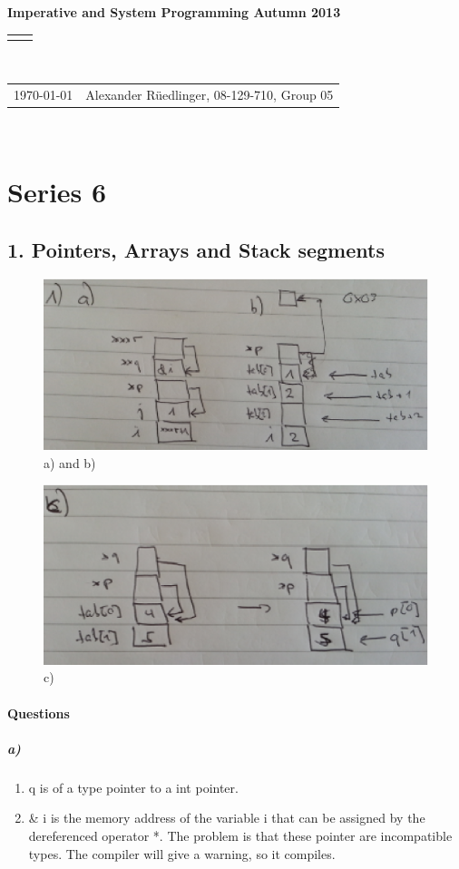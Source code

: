 \documentclass[12pt]{article}
\renewcommand{\title}[1]{\textbf{#1}\\}
\renewcommand{\line}{\begin{tabularx}{\textwidth}{X>{\raggedleft}X}\hline\\\end{tabularx}\\[-0.5cm]}
\newcommand{\leftright}[2]{\begin{tabularx}{\textwidth}{X>{\raggedleft}X}#1%
& #2\\\end{tabularx}\\[-0.5cm]}
\begin{document}
\title{Imperative and System Programming Autumn 2013}
\line
\leftright{\today}{Alexander Rüedlinger, 08-129-710, Group 05} %
\section*{Series 6}

\subsection*{1. Pointers, Arrays and Stack segments}
\begin{figure}[!htb]
\centering
\includegraphics[scale=0.5]{eps/1a_b.eps} 
\caption{a) and b)}
\end{figure}

\begin{figure}[!htb]
\centering
\includegraphics[scale=0.5]{eps/1c.eps} 
\caption{c)}
\end{figure}

\paragraph{Questions}
\subparagraph{a)}
\begin{enumerate}
\item q is of a type pointer to a int pointer.
\item \& i is the memory address of the variable i that can be assigned by the dereferenced operator *. The problem is that these pointer are incompatible types. The compiler will give a warning, so it compiles.
\end{enumerate}
\end{document}
